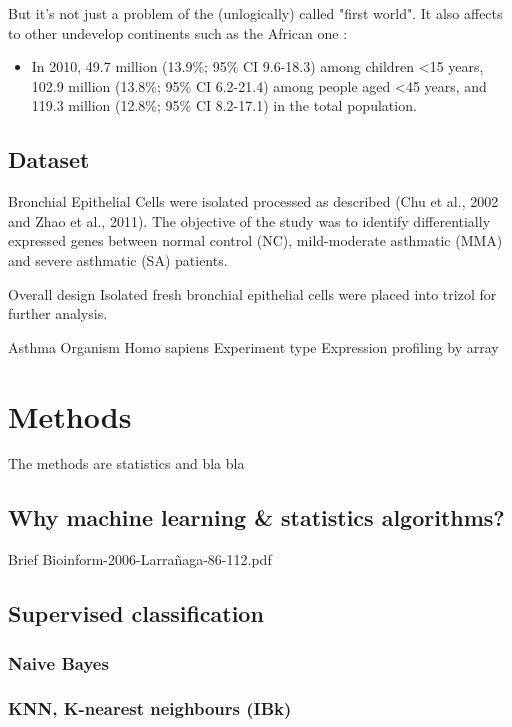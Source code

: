 \documentclass[conference,a4paper]{IEEEtran}
\begin{document}
But it's not just a problem of the (unlogically) called "first world". It also affects to other undevelop continents such as the African one \cite{asthmaAfrica}:

\begin{itemize}
	\item In 2010, 49.7 million (13.9\%; 95\% CI 9.6-18.3) among children <15 years, 102.9 million (13.8\%; 95\% CI 6.2-21.4) among people aged <45 years, and 119.3 million (12.8\%; 95\% CI 8.2-17.1) in the total population.
\end{itemize}


\subsection{Dataset}

Bronchial Epithelial Cells were isolated processed as described (Chu et al., 2002 and Zhao et al., 2011). The objective of the study was to identify differentially expressed genes between normal control (NC), mild-moderate asthmatic (MMA) and severe asthmatic (SA) patients.

Overall design	Isolated fresh bronchial epithelial cells were placed into trizol for further analysis.

	Asthma
	Organism	Homo sapiens
	Experiment type	Expression profiling by array

\section{Methods}

The methods are statistics and bla bla

\subsection{Why machine learning \& statistics algorithms?}

Brief Bioinform-2006-Larrañaga-86-112.pdf

\subsection{Supervised classification}

\subsubsection{Naive Bayes}

\subsubsection{KNN, K-nearest neighbours (IBk)}
\end{document}

